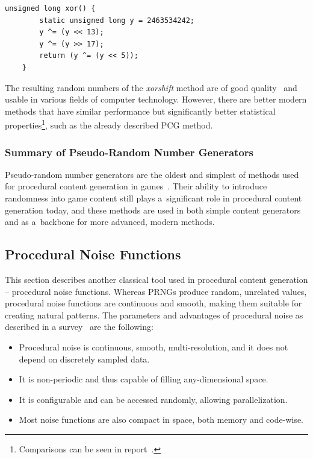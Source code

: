 \begin{lstlisting}[caption={32-bit example xorshift implementation.}, label={code:xorshift-example-code}]
    unsigned long xor() {
        static unsigned long y = 2463534242;
        y ^= (y << 13);
        y ^= (y >> 17);
        return (y ^= (y << 5));
    }
\end{lstlisting}

The resulting random numbers of the \emph{xorshift} method are of good quality~\cite{marsaglia-xorshift} and usable in various fields of computer technology. However, there are better modern methods that have similar performance but significantly better statistical properties\footnote{Comparisons can be seen in report~\cite{oneill:pcg2014}.}, such as the already described PCG method.

\subsubsection*{Summary of Pseudo-Random Number Generators}
Pseudo-random number generators are the oldest and simplest of methods used for procedural content generation in games~\cite{proc-cont-gen-games-survey-hendrikx}. Their ability to introduce randomness into game content still plays a~significant role in procedural content generation today, and these methods are used in both simple content generators and as a~backbone for more advanced, modern methods.

\subsection{Procedural Noise Functions}\label{proc_noise_functions}
This section describes another classical tool used in procedural content generation -- procedural noise functions. Whereas PRNGs produce random, unrelated values, procedural noise functions are continuous and smooth, making them suitable for creating natural patterns. The parameters and advantages of procedural noise as described in a survey~\cite{lagae-proc-noise-survey} are the following:

\begin{itemize}
    \item Procedural noise is continuous, smooth, multi-resolution, and it does not depend on discretely sampled data.
    \item It is non-periodic and thus capable of filling any-dimensional space.
    \item It is configurable and can be accessed randomly, allowing parallelization.
    \item Most noise functions are also compact in space, both memory and code-wise.
\end{itemize}

